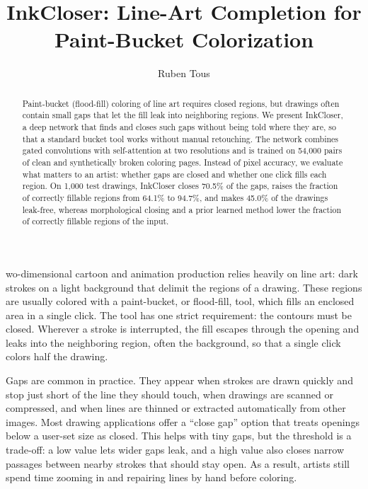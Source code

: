 \documentclass{IEEEcsmag}
\providecommand{\DIFaddtex}[1]{{\color{blue}#1}} %
\providecommand{\DIFdeltex}[1]{} %
\providecommand{\DIFaddbegin}{} %
\providecommand{\DIFaddend}{} %
\providecommand{\DIFdelbegin}{} %
\providecommand{\DIFdelend}{} %
\providecommand{\DIFaddtex}[1]{\DIFaddtex{#1}} %
\providecommand{\DIFdeltex}[1]{\DIFdeltex{#1}} %
\providecommand{\DIFaddbegin}{} %
\providecommand{\DIFadd}[1]{\texorpdfstring{\DIFaddtex{#1}}{#1}} %
\providecommand{\DIFdel}[1]{\texorpdfstring{\DIFdeltex{#1}}{}} %
\begin{document}
\DIFaddbegin {}
\DIFaddend 


\title{InkCloser: Line-Art Completion for Paint-Bucket Colorization}

\author{Ruben Tous}


\begin{abstract}
Paint-bucket (flood-fill) coloring of line art requires closed regions, but drawings
often contain small gaps that let the fill leak into neighboring regions. We present
InkCloser, a deep network that finds and closes such gaps without being told where
they are, so that a standard bucket tool works without manual retouching. The
network combines gated convolutions with self-attention at two resolutions and is trained on 54,000 pairs of clean and synthetically broken coloring pages. Instead of pixel accuracy, we evaluate what matters
to an artist: whether gaps are closed and whether one click fills each region. On
1,000 test drawings, InkCloser closes 70.5\% of the gaps, raises the fraction of
correctly fillable regions from 64.1\% to 94.7\%, and makes 45.0\% of the drawings
leak-free, whereas morphological closing and a prior learned method \DIFdelbegin \DIFdel{do not improve on the }\DIFdelend \DIFaddbegin \DIFadd{lower the fraction of correctly fillable regions of the }\DIFaddend input.
\end{abstract}

\maketitle

wo-dimensional cartoon and animation production relies heavily on line
art: dark strokes on a light background that delimit the regions of a drawing. These
regions are usually colored with a paint-bucket, or flood-fill, tool, which fills an
enclosed area in a single click. The tool has one strict requirement: the contours
must be closed. Wherever a stroke is interrupted, the fill escapes through the
opening and leaks into the neighboring region, often the background, so that a
single click colors half the drawing.

Gaps are common in practice. They appear when strokes are drawn quickly and stop
just short of the line they should touch, when drawings are scanned or compressed,
and when lines are thinned or extracted automatically from other images. Most
drawing applications offer a ``close gap'' option that treats openings below a
user-set size as closed. This helps with tiny gaps, but the threshold is a
trade-off: a low value lets wider gaps leak, and a high value also closes narrow
passages between nearby strokes that should stay open. As a result, artists still
spend time zooming in and repairing lines by hand before coloring.
\end{document}

